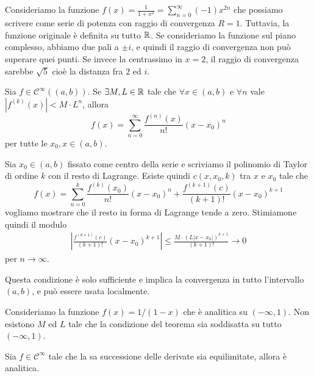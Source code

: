 \documentclass[a4paper]{article}
\begin{document}
\begin{snippetexample}{}
    Consideriamo la funzione \(f(x) = \frac{1}{1 + x^2} = \sum_{n=0}^\infty {(-1)} x^{2n}\)
    che possiamo scrivere come serie di potenza con raggio di convergenza \(R=1\).
    Tuttavia, la funzione originale è definita su tutto \(\mathbb{R}\).
    Se consideriamo la funzione sul piano complesso, abbiamo due pali a \(\pm i\),
    e quindi il raggio di convergenza non può superare quei punti.
    Se invece la centrassimo in \(x=2\), il raggio di convergenza sarebbe \(\sqrt{5}\)
    cioè la distanza fra \(2\) ed \(i\).
\end{snippetexample}

\begin{snippettheorem}{}
    Sia \(f \in \mathcal C^\infty((a,b))\).
    Se \(\exists M, L \in \mathbb{R}\)
    tale che \(\forall x \in (a,b)\) e \(\forall n\) vale
    \(|f^{(k)}(x)| < M \cdot L^n\), allora
    \[
        f(x) = \sum_{n=0}^\infty \frac{f^{(n)}(x)}{n!}(x-x_0)^n
    \]
    per tutte le \(x_0, x \in (a,b)\).
\end{snippettheorem}

\begin{snippetproof}{}
    Sia \(x_0 \in (a,b)\) fissato come centro della serie e scriviamo
    il polinomio di Taylor di ordine \(k\) con il resto di Lagrange.
    Esiste quindi \(c(x, x_0, k)\) tra \(x\) e \(x_0\) tale che
    \[
        f(x) = \sum_{n=0}^k \frac{f^{(k)}(x_0)}{n!}(x-x_0)^n
        + \frac{f^{(k+1)}(c)}{(k+1)!}(x-x_0)^{k+1}
    \]
    vogliamo mostrare che il resto in forma di Lagrange tende a zero. Stimiamone quindi il modulo
    \begin{align*}
        \left|
            \frac{f^{(k+1)}(c)}{(k+1)!}(x-x_0)^{k+1}
        \right| \leq \frac{M \cdot (L |x-x_0|)^{k+1}}{(k+1)!} \to 0
    \end{align*}
    per \(n \to \infty\).
\end{snippetproof}

Questa condizione è solo sufficiente e implica la convergenza in tutto l'intervallo \((a,b)\),
e può essere usata localmente.

\begin{snippetexample}{}
    Consideriamo la funzione \(f(x) = 1 / (1-x)\)
    che è analitica su \((-\infty, 1)\).
    Non esistono \(M\) ed \(L\) tale che
    la condizione del teorema %
    sia soddisatta su tutto \((-\infty, 1)\).
\end{snippetexample}

\begin{snippetproposition}{}
    Sia \(f \in \mathcal C^\infty\) tale che la sa successione delle derivate sia equilimitate,
    allora è analitica.
\end{snippetproposition}
\end{document}

